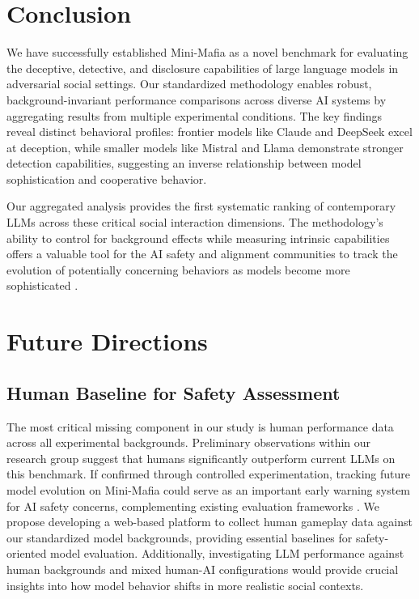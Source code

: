 \documentclass{article}
\begin{document}
\section{Conclusion}

We have successfully established Mini-Mafia as a novel benchmark for evaluating the deceptive, detective, and disclosure capabilities of large language models in adversarial social settings. Our standardized methodology enables robust, background-invariant performance comparisons across diverse AI systems by aggregating results from multiple experimental conditions. The key findings reveal distinct behavioral profiles: frontier models like Claude and DeepSeek excel at deception, while smaller models like Mistral and Llama demonstrate stronger detection capabilities, suggesting an inverse relationship between model sophistication and cooperative behavior.

Our aggregated analysis provides the first systematic ranking of contemporary LLMs across these critical social interaction dimensions. The methodology's ability to control for background effects while measuring intrinsic capabilities offers a valuable tool for the AI safety and alignment communities to track the evolution of potentially concerning behaviors as models become more sophisticated \citep{hendrycks2023overview, morris2023levels}.

\section{Future Directions}

\subsection{Human Baseline for Safety Assessment}

The most critical missing component in our study is human performance data across all experimental backgrounds. Preliminary observations within our research group suggest that humans significantly outperform current LLMs on this benchmark. If confirmed through controlled experimentation, tracking future model evolution on Mini-Mafia could serve as an important early warning system for AI safety concerns, complementing existing evaluation frameworks \citep{sennott2023machiavelli, mao2023alympics}. We propose developing a web-based platform to collect human gameplay data against our standardized model backgrounds, providing essential baselines for safety-oriented model evaluation. Additionally, investigating LLM performance against human backgrounds and mixed human-AI configurations would provide crucial insights into how model behavior shifts in more realistic social contexts.
\end{document}
